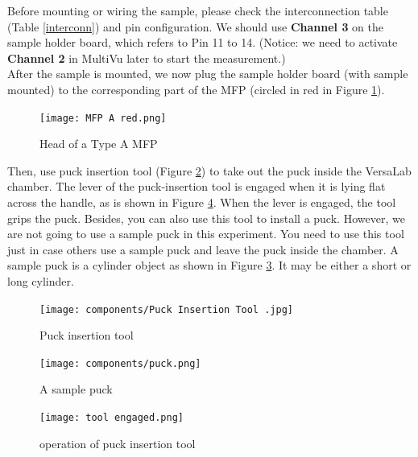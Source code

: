 \documentclass{article}
\begin{document}
            Before mounting or wiring the sample, please check the interconnection table (Table \ref{interconn}) and pin configuration. We should use \textbf{Channel 3} on the sample holder board, which refers to Pin 11 to 14. (Notice: we need to activate \textbf{Channel 2} in MultiVu later to start the measurement.)\\
            
            After the sample is mounted, we now plug the sample holder board (with sample mounted) to the corresponding part of the MFP (circled in red in Figure \ref{MFP a red}).

            \begin{figure}[H]
                \centering
                \texttt{[image: MFP A red.png]}
                \caption{Head of a Type A MFP}
                \label{MFP a red}
            \end{figure}

            Then, use puck insertion tool (Figure \ref{puck tool}) to take out the puck inside the VersaLab chamber. The lever of the puck-insertion tool is engaged when it is lying flat across the handle, as is shown in Figure \ref{tool engaged}. When the lever is engaged, the tool grips the puck. Besides, you can also use this tool to install a puck. However, we are not going to use a sample puck in this experiment. You need to use this tool just in case others use a sample puck and leave the puck inside the chamber. A sample puck is a cylinder object as shown in Figure \ref{puck}. It may be either a short or long cylinder.

            \begin{figure}[H]
                \centering
                \texttt{[image: components/Puck Insertion Tool .jpg]}
                \caption{Puck insertion tool}
                \label{puck tool}
            \end{figure}

            \begin{figure}[H]
                \centering
                \texttt{[image: components/puck.png]}
                \caption{A sample puck}
                \label{puck}
            \end{figure}

            \begin{figure}[H]
                \centering
                \texttt{[image: tool engaged.png]}
                \caption{operation of puck insertion tool}
                \label{tool engaged}
            \end{figure}
            
\end{document}

